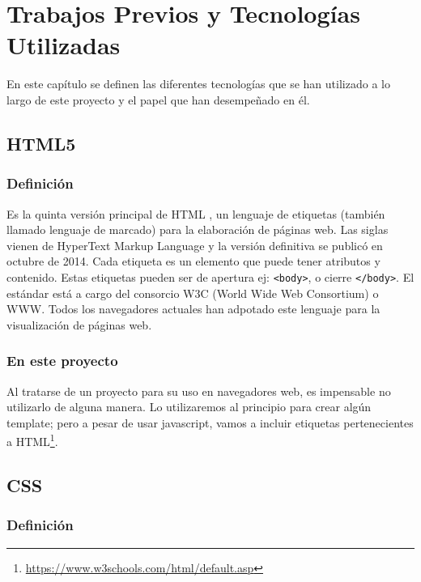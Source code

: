 \documentclass[a4paper, 12pt]{book}
\begin{document}
\chapter{Trabajos Previos y Tecnologías Utilizadas}
\label{sec:estudioarte} %

En este capítulo se definen las diferentes tecnologías que se han utilizado a lo largo de este proyecto y el papel que han desempeñado en él.



\section{HTML5}
\label{sec:html5}
\subsection{Definición}

Es la quinta versión principal de HTML \cite{pilgrim:_html5guide}, un lenguaje de etiquetas (también llamado lenguaje de marcado) para la elaboración de páginas web. Las siglas vienen de HyperText Markup Language y la versión definitiva se publicó en octubre de 2014. Cada etiqueta es un elemento que puede tener atributos y contenido. Estas etiquetas pueden ser de apertura ej: \verb|<body>|, o cierre \verb|</body>|. El estándar está a cargo del consorcio W3C (World Wide Web Consortium) o WWW. Todos los navegadores actuales han adpotado este lenguaje para la visualización de páginas web. 

\subsection{En este proyecto}

Al tratarse de un proyecto para su uso en navegadores web, es impensable no utilizarlo de alguna manera. Lo utilizaremos al principio para crear algún template; pero a pesar de usar javascript, vamos a incluir etiquetas pertenecientes a HTML\footnote{\url{https://www.w3schools.com/html/default.asp}}.



\section{CSS}
\label{sec:css}
\subsection{Definición}
\end{document}
